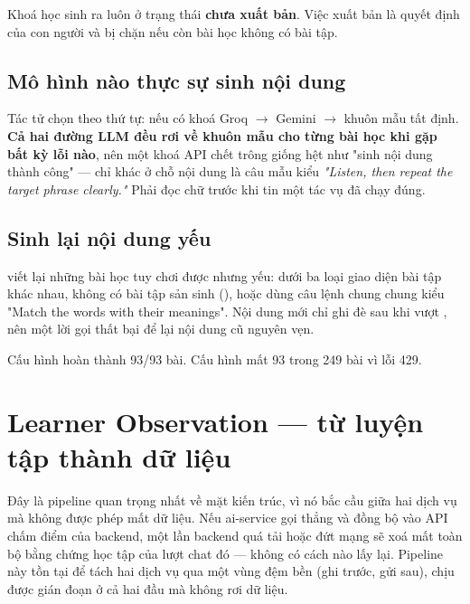 Khoá học sinh ra luôn ở trạng thái \textbf{chưa xuất bản}. Việc xuất bản là quyết định của
con người và bị chặn nếu còn bài học không có bài tập.

\subsection{Mô hình nào thực sự sinh nội dung}

Tác tử chọn theo thứ tự:  nếu có khoá Groq $\rightarrow$ Gemini
$\rightarrow$ khuôn mẫu tất định. \textbf{Cả hai đường LLM đều rơi về khuôn mẫu cho từng
bài học khi gặp bất kỳ lỗi nào}, nên một khoá API chết trông giống hệt như "sinh nội dung
thành công" — chỉ khác ở chỗ nội dung là câu mẫu kiểu \textit{"Listen, then repeat the
target phrase clearly."} Phải đọc chữ trước khi tin một tác vụ đã chạy đúng.

\subsection{Sinh lại nội dung yếu}

 viết lại những bài học tuy chơi
được nhưng yếu: dưới ba loại giao diện bài tập khác nhau, không có bài tập sản sinh
(), hoặc dùng câu lệnh chung chung kiểu "Match the words with their
meanings". Nội dung mới chỉ ghi đè sau khi vượt , nên một lời gọi
thất bại để lại nội dung cũ nguyên vẹn.

\begin{luuy}
Cấu hình  hoàn thành 93/93 bài. Cấu hình
 mất 93 trong 249 bài vì lỗi 429.
\end{luuy}

\section{Learner Observation — từ luyện tập thành dữ liệu}

Đây là pipeline quan trọng nhất về mặt kiến trúc, vì nó bắc cầu giữa hai dịch vụ mà không
được phép mất dữ liệu. Nếu ai-service gọi thẳng và đồng bộ vào API chấm điểm của backend,
một lần backend quá tải hoặc đứt mạng sẽ xoá mất toàn bộ bằng chứng học tập của lượt chat
đó — không có cách nào lấy lại. Pipeline này tồn tại để tách hai dịch vụ qua một vùng đệm
bền (ghi trước, gửi sau), chịu được gián đoạn ở cả hai đầu mà không rơi dữ liệu.

